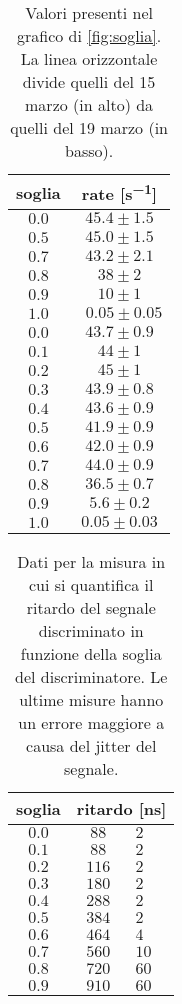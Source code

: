 \begin{table}[h]
\centering

\begin{tabular}{c|c}
soglia & rate [\si{s^{-1}}] \\
\hline
$ 0.0 $ & $ 45.4 \pm 1.5 $\\ 
$ 0.5 $ & $ 45.0 \pm 1.5 $\\ 
$ 0.7 $ & $ 43.2 \pm 2.1 $\\ 
$ 0.8 $ & $ 38 \pm 2 $\\ 
$ 0.9 $ & $ 10 \pm 1 $\\ 
$ 1.0 $ & $\;\; 0.05 \pm 0.05 $\\ 
\hline
$ 0.0 $ & $ 43.7 \pm 0.9 $\\ 
$ 0.1 $ & $ 44 \pm 1 $\\ 
$ 0.2 $ & $ 45 \pm 1 $\\ 
$ 0.3 $ & $ 43.9 \pm 0.8 $\\ 
$ 0.4 $ & $ 43.6 \pm 0.9 $\\ 
$ 0.5 $ & $ 41.9 \pm 0.9 $\\ 
$ 0.6 $ & $ 42.0 \pm 0.9 $\\ 
$ 0.7 $ & $ 44.0 \pm 0.9 $\\ 
$ 0.8 $ & $ 36.5 \pm 0.7 $\\ 
$ 0.9 $ & $ 5.6 \pm 0.2 $\\ 
$ 1.0 $ & $ 0.05 \pm 0.03 $\\ 

\end{tabular}

\caption{Valori presenti nel grafico di \autoref{fig:soglia}. La linea orizzontale divide quelli del 15 marzo (in alto) da quelli del 19 marzo (in basso).}
\label{tab:soglia}
\end{table}



\begin{table}[h]
\centering

\begin{tabular}{c|c @{\,$\pm$\,} l}
soglia & \multicolumn{2}{c}{ritardo [\si{ns}]} \\
\hline
$ 0.0 $ & $ 88 $ & $ 2 $\\ 
$ 0.1 $ & $ 88 $ & $ 2 $\\ 
$ 0.2 $ & $ 116 $ & $ 2 $\\ 
$ 0.3 $ & $ 180 $ & $ 2 $\\ 
$ 0.4 $ & $ 288 $ & $ 2 $\\ 
$ 0.5 $ & $ 384 $ & $ 2 $\\ 
$ 0.6 $ & $ 464 $ & $ 4 $\\ 
$ 0.7 $ & $ 560 $ & $ 10 $\\ 
$ 0.8 $ & $ 720 $ & $ 60 $\\ 
$ 0.9 $ & $ 910 $ & $ 60 $\\ 
\end{tabular}

\caption{Dati per la misura in cui si quantifica il ritardo del segnale discriminato in funzione della soglia del discriminatore.
Le ultime misure hanno un errore maggiore a causa del jitter del segnale.}
\label{tab:rit}
\end{table}


